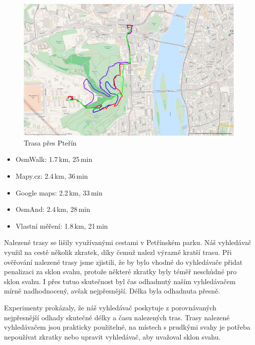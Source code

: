 \begin{figure}[h]
	\centering
	\includegraphics[width=12cm]{../img/ms-sh.png}
	\caption{Trasa přes Pteřín}
	\label{fig:kol-hol}
\end{figure}
\begin{itemize}
	\item OsmWalk: 1.7\,km, 25\,min
	\item Mapy.cz: 2.4\,km, 36\,min
	\item Google maps: 2.2\,km, 33\,min
	\item OsmAnd: 2.4\,km, 28\,min
	\item Vlastní měření: 1.8\,km, 21\,min
\end{itemize}

Nalezené trasy se lišily využívanými cestami v Petřínském parku. Náš vyhledávač
využil na cestě několik zkratek, díky čemuž nalezl výrazně kratší trasu. Při
ověřování nalezené trasy jsme zjistili, že by bylo vhodné do vyhledávače přidat
penalizaci za sklon svahu, protože některé zkratky byly téměř neschůdné
pro sklon svahu. I přes tutuo skutečnost byl čas odhadnutý naším vyhledávačem
mírně nadhodnocený, avšak nejpřesnější. Délka byla odhadnuta přesně.

Experimenty prokázaly, že náš vyhledávač poskytuje z porovnávaných nejpřesnější
odhady skutečné délky a času nalezených tras. Trasy nalezené vyhledávačem jsou
prakticky použitelné, na místech s prudkými svahy je potřeba nepoužívat zkratky
nebo upravit vyhledávač, aby uvažoval sklon svahu. 
